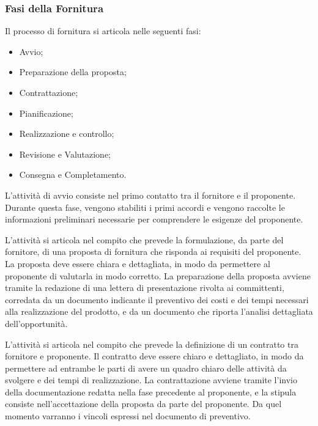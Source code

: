 \subsubsection{Fasi della Fornitura}
\label{sec:Fasi della Fornitura}
Il processo di fornitura si articola nelle seguenti fasi:
\begin{itemize}
    \item Avvio;
    \item Preparazione della proposta;
    \item Contrattazione;
    \item Pianificazione;
    \item Realizzazione e controllo;
    \item Revisione e Valutazione;
    \item Consegna e Completamento.
\end{itemize}

L'attività di avvio consiste nel primo contatto tra il fornitore e il proponente. Durante questa fase, vengono stabiliti i primi accordi e vengono raccolte le informazioni preliminari necessarie per comprendere le esigenze del proponente.

L'attività si articola nel compito che prevede la formulazione, da parte del fornitore, di una proposta di fornitura che risponda ai requisiti del proponente. La proposta deve essere chiara e dettagliata, in modo da permettere al proponente di valutarla in modo corretto. La preparazione della proposta avviene tramite la redazione di una lettera di presentazione rivolta ai committenti, corredata da un documento indicante il preventivo dei costi e dei tempi necessari alla realizzazione del prodotto, e da un documento che riporta l'analisi dettagliata dell'opportunità.

L'attività si articola nel compito che prevede la definizione di un contratto tra fornitore e proponente. Il contratto deve essere chiaro e dettagliato, in modo da permettere ad entrambe le parti di avere un quadro chiaro delle attività da svolgere e dei tempi di realizzazione. La contrattazione avviene tramite l'invio della documentazione redatta nella fase precedente al proponente, e la stipula consiste nell'accettazione della proposta da parte del proponente. Da quel momento varranno i vincoli espressi nel documento di preventivo.

